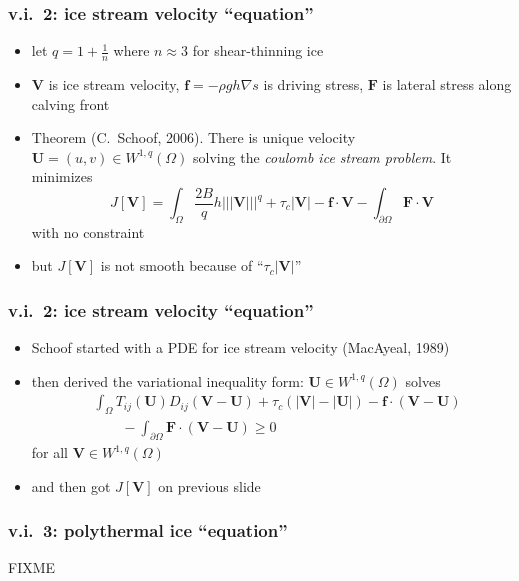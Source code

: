 \documentclass{beamer}
\newcommand{\grad}{\nabla}
\newcommand{\Tnorm}[1]{\left|\!\left|\!\left|#1\right|\!\right|\!\right|}
\begin{document}
\begin{frame}
  \frametitle{v.i.~2: ice stream velocity ``equation''}

\begin{itemize}
\item let $q = 1+\frac{1}{n}$ where $n\approx 3$ for shear-thinning ice
\item $\mathbf{V}$ is ice stream velocity, $\mathbf{f} = - \rho g h \grad s$ is driving stress, $\mathbf{F}$ is lateral stress along calving front
\item Theorem (C.~Schoof, 2006).  There is unique velocity $\mathbf{U}=(u,v)\in W^{1,q}(\Omega)$ solving the \emph{coulomb ice stream problem}.  It minimizes
\small
\begin{equation*}
J[\mathbf{V}] = \int_\Omega \frac{2 B}{q} h \Tnorm{\mathbf{V}}^q + \tau_c |\mathbf{V}| - \mathbf{f} \cdot \mathbf{V}  - \int_{\partial\Omega} \mathbf{F} \cdot \mathbf{V}
\end{equation*}
\normalsize
with no constraint
\item but $J[\mathbf{V}]$ is not smooth because of ``$\tau_c |\mathbf{V}|$''
\end{itemize}
\end{frame}


\begin{frame}
  \frametitle{v.i.~2: ice stream velocity ``equation''}

\begin{itemize}
\item Schoof started with a PDE for ice stream velocity (MacAyeal, 1989)
\item then derived the variational inequality form: $\mathbf{U} \in W^{1,q}(\Omega)$ solves
\begin{align*}
&\int_\Omega T_{ij}(\mathbf{U}) D_{ij}\left(\mathbf{V} - \mathbf{U}\right) + \tau_c \left(|\mathbf{V}| - |\mathbf{U}|\right) - \mathbf{f} \cdot \left(\mathbf{V} - \mathbf{U}\right) \\
&\qquad - \int_{\partial\Omega} \mathbf{F} \cdot \left(\mathbf{V} - \mathbf{U}\right) \ge 0
\end{align*}
for all $\mathbf{V}\in W^{1,q}(\Omega)$
\item and then got $J[\mathbf{V}]$ on previous slide
\end{itemize}
\end{frame}


\begin{frame}
  \frametitle{v.i.~3: polythermal ice ``equation''}

FIXME
\end{frame}
\end{document}
